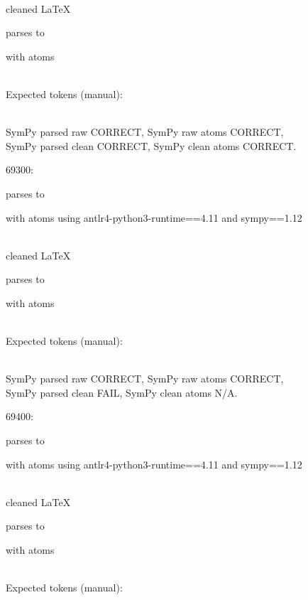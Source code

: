 \documentclass{article}
\begin{document}
\ \\
cleaned \LaTeX

parses to

with atoms


\ \\
Expected tokens (manual):




\ \\
SymPy parsed raw CORRECT, 
SymPy raw atoms CORRECT, \\
SymPy parsed clean CORRECT, 
SymPy clean atoms CORRECT.

\hrulefill

69300:

parses to

with atoms
using antlr4-python3-runtime==4.11 and sympy==1.12

\ \\
cleaned \LaTeX

parses to

with atoms


\ \\
Expected tokens (manual):



\ \\
SymPy parsed raw CORRECT, 
SymPy raw atoms CORRECT, \\
SymPy parsed clean FAIL, 
SymPy clean atoms N/A.

\hrulefill

69400:

parses to

with atoms
using antlr4-python3-runtime==4.11 and sympy==1.12

\ \\
cleaned \LaTeX

parses to

with atoms


\ \\
Expected tokens (manual):

\end{document}
